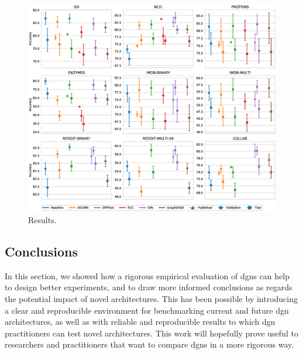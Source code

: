 \begin{figure}[h!]
    \centering
    \includegraphics[width=\linewidth]{Figures/Chapter4/07-comparison-results}
    \caption{Results.}
    \label{fig:comparison-plot}
\end{figure}

\subsection{Conclusions}
In this section, we showed how a rigorous empirical evaluation of \glspl{dgn} can help to design better experiments, and to draw more informed conclusions as regards the potential impact of novel architectures. This has been possible by introducing a clear and reproducible environment for benchmarking current and future \gls{dgn} architectures, as well as with reliable and reproducible results to which \gls{dgn} practitioners can test novel architectures. This work will hopefully prove useful to researchers and practitioners that want to compare \glspl{dgn} in a more rigorous way.
